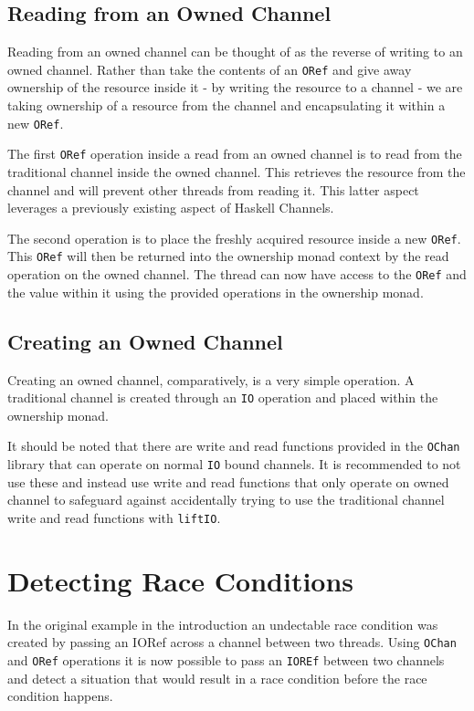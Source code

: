 \documentclass[onehalf,11pt]{beavtex}
\begin{document}
\subsection{Reading from an Owned Channel}

Reading from an owned channel can be thought of as the reverse of
writing to an owned channel.  Rather than take the contents of an
\texttt{ORef} and give away ownership of the resource inside it - by writing the
resource to a channel - we are taking ownership of a resource from the channel
and encapsulating it within a new \texttt{ORef}.

The first \texttt{ORef} operation inside a read from an owned channel
is to read from the traditional channel inside the owned channel. This
retrieves the resource from the channel and will prevent other threads from
reading it. This latter aspect leverages a previously existing aspect of
Haskell Channels. %

The second operation is to place the freshly acquired resource inside a new
\texttt{ORef}.  This \texttt{ORef} will then be returned into the
ownership monad context by the read operation on the
owned channel.  The thread can now have access to the \texttt{ORef}
and the value within it using the provided operations in the
ownership monad.


\subsection{Creating an Owned Channel}

Creating an owned channel, comparatively, is a very simple operation.
A traditional channel is created through an \texttt{IO} operation and placed
within the ownership monad.

It should be noted that there are write and read functions provided
in the \texttt{OChan} library that can operate on normal \texttt{IO} bound
channels.  It is recommended to not use these and instead use write and read
functions that only operate on owned channel to safeguard against
accidentally trying to use the traditional channel write and read functions
with \texttt{liftIO}.

\section{Detecting Race Conditions}

In the original example in the introduction an undectable race condition was
created by passing an IORef across a channel between two threads.
Using \texttt{OChan} and \texttt{ORef} operations it is now possible
to pass an \texttt{IOREf} between two channels and detect a situation
that would result in a race condition before the race condition happens.
\end{document}

